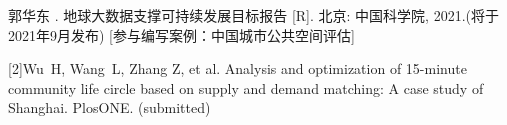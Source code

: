 \documentclass{shnuthesis}
\begin{document}


\backmatter  %



%





\begin{researchpage}
[1] 郭华东 . 地球大数据支撑可持续发展目标报告 [R]. 北京: 中国科学院, 2021.(将于2021年9月发布)
[参与编写案例：中国城市公共空间评估]

[2]Wu~H, Wang~L, Zhang Z, et al. Analysis and optimization of 15-minute community life circle based on supply and demand matching: A case study of Shanghai. PlosONE. (submitted)

\end{researchpage}


\end{document}
